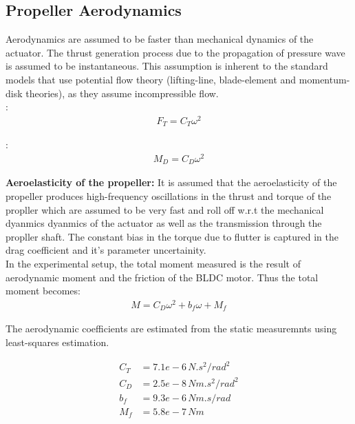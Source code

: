 \subsection{Propeller Aerodynamics}
Aerodynamics are assumed to be faster than mechanical dynamics of the actuator.
The thrust generation process due to the propagation of pressure wave is assumed to be instantaneous. This assumption is inherent to the standard models that use potential flow theory (lifting-line, blade-element and momentum-disk theories), as they assume incompressible flow.\\

:
\begin{align*}
    F_T = C_{T} \omega^2
\end{align*}

:
\begin{align*}
    M_D = C_{D} \omega^2
\end{align*}

\textbf{Aeroelasticity of the propeller:} It is assumed that the aeroelasticity of the propeller produces high-frequency oscillations in the thrust and torque of the propller which are assumed to be very fast and roll off w.r.t the mechanical dyanmics dyanmics of the actuator as well as the transmission through the propller shaft. The constant  bias in the torque due to flutter is captured in the drag coefficient and it's parameter uncertainity.\\

In the experimental setup, the total moment measured is the result of aerodynamic moment and the friction of the BLDC motor. Thus the total moment becomes:
\begin{align*}
    M = C_D \omega^2 + b_f \omega + M_f
\end{align*}

The aerodynamic coefficients are estimated from the static measuremnts using least-squares estimation.

\begin{align*}
    C_T &= 7.1e-6 \, {N.s^2/rad^2}\\
    C_D &= 2.5e-8 \, {Nm.s^2/rad^2}\\
    b_f &= 9.3e-6 \, {Nm.s/rad}\\
    M_f &= 5.8e-7  \, {Nm}
\end{align*}

